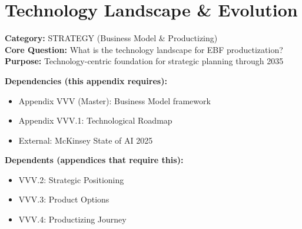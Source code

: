 %
%
%

\section{Technology Landscape \& Evolution}
\label{sec:vvv0-technology-landscape}


\begin{tcolorbox}[colback=gray!5!white, colframe=gray!75!black,
    title=\textbf{Appendix: VVV.0 STRATEGY-TECH}]

\textbf{Category:} STRATEGY (Business Model \& Productizing) \\
\textbf{Core Question:} What is the technology landscape for EBF productization? \\
\textbf{Purpose:} Technology-centric foundation for strategic planning through 2035

\end{tcolorbox}


\begin{tcolorbox}[colback=yellow!5!white, colframe=yellow!75!black,
    title=\textbf{Cross-Reference Map}]

\textbf{Dependencies (this appendix requires):}
\begin{itemize}[nosep]
    \item Appendix VVV (Master): Business Model framework
    \item Appendix VVV.1: Technological Roadmap
    \item External: McKinsey State of AI 2025
\end{itemize}

\textbf{Dependents (appendices that require this):}
\begin{itemize}[nosep]
    \item VVV.2: Strategic Positioning
    \item VVV.3: Product Options
    \item VVV.4: Productizing Journey
\end{itemize}

\end{tcolorbox}

